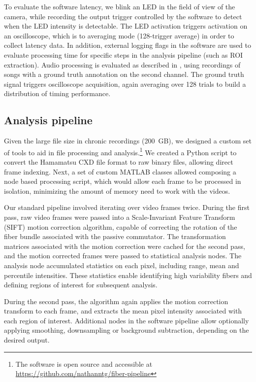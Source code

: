 To evaluate the software latency, we blink an LED in the 
field of view of the camera, while recording the output trigger 
controlled by the software to detect when the LED intensity is 
detectable. The LED activation triggers activation on an 
oscilloscope, which is to averaging mode (128-trigger average) 
in order to collect latency data. In addition, external logging
flags in the software are used to evaluate processing time for 
specific steps in the analysis pipeline (such as ROI extraction).
Audio processing is evaluated as described in \cite{Pearre:2017cs},
using recordings of songs with a ground truth annotation on the 
second channel. The ground truth signal triggers oscilloscope 
acquisition, again averaging over 128 trials to build a distribution 
of timing performance.

\subsection{Analysis pipeline}
\label{sec:pipeline}

Given the large file size in chronic recordings (200~GB), 
we designed a custom set of tools to aid in file 
processing and analysis.\footnote{The software is open 
source and accessible at 
\url{https://github.com/nathanntg/fiber-pipeline}} 
We created a Python script to 
convert the Hamamatsu CXD file format to raw binary files, 
allowing direct frame indexing. Next, a set of custom 
MATLAB classes allowed composing a node based processing 
script, which would allow each frame to be processed in 
isolation, minimizing the amount of memory need to work 
with the videos.

Our standard pipeline involved iterating over video frames 
twice. During the first pass, raw video frames were 
passed into a Scale-Invariant Feature Transform (SIFT) 
\cite{vedaldi08vlfeat,lowe1999object,Lowe:2004kp} 
motion correction algorithm, capable of correcting 
the rotation of the fiber bundle associated with the 
passive commutator. The transformation matrices 
associated with the motion correction were cached 
for the second pass, and the motion corrected frames 
were passed to statistical analysis nodes. The analysis 
node accumulated statistics on each pixel, including 
range, mean and percentile intensities. These statistics 
enable identifying high variability fibers and defining 
regions of interest for subsequent analysis.

During the second pass, the algorithm again applies the 
motion correction transform to each frame, and extracts 
the mean pixel intensity associated with each region of 
interest. Additional nodes in the software pipeline allow 
optionally applying smoothing, downsampling or background 
subtraction, depending on the desired output.

